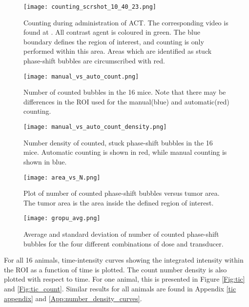 \begin{figure}[h]
  \centering
  \texttt{[image: counting\_scrshot\_10\_40\_23.png]}
  \cprotect\caption{Counting during administration of ACT\texttrademark{}. The corresponding video is found at . All contrast agent is coloured in green. The blue boundary defines the region of interest, and counting is only performed within this area. Areas which are identified as stuck phase-shift bubbles are circumscribed with red.}
  \label{Fig:counting_administration}
\end{figure}



\begin{figure}[h]
  \centering
  \texttt{[image: manual\_vs\_auto\_count.png]}
  \caption{Number of counted bubbles in the 16 mice. Note that there may be differences in the ROI used for the manual(blue) and automatic(red) counting.}
  \label{Fig:Number of counted bubbles}
\end{figure}

\begin{figure}[h]
  \centering
  \texttt{[image: manual\_vs\_auto\_count\_density.png]}
  \caption{Number density of counted, stuck phase-shift bubbles in the 16 mice. Automatic counting is shown in red, while manual counting is shown in blue.}
  \label{Fig:Number density of counted bubbles}
\end{figure}


\begin{figure}[h]
	\centering
	\texttt{[image: area\_vs\_N.png]}
	\caption{Plot of number of counted phase-shift bubbles versus tumor area. The tumor area is the area inside the defined region of interest.}
	\label{Fig:area_vs_N}
\end{figure}

\begin{figure}[h]
	\centering
	\texttt{[image: gropu\_avg.png]}
	\caption{Average and standard deviation of number of counted phase-shift bubbles for the four different combinations of dose and transducer.}
	\label{Fig:group avg}
\end{figure}


For all 16 animals, time-intensity curves showing the integrated intensity within the ROI as a function of time is plotted. The count number density is also plotted with respect to time. For one animal, this is presented in Figure \ref{Fig:tic} and \ref{Fig:tic_count}. Similar results for all animals are found in Appendix \ref{tic appendix} and \ref{App:number_density_curves}.


